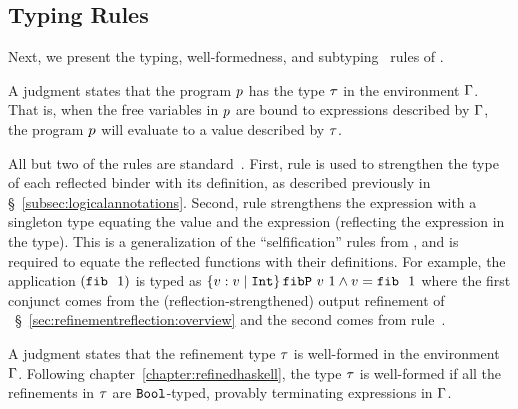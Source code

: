 \subsection{Typing Rules}

%
Next, we present the
typing, well-formedness, and subtyping~\citep{Knowles10,Vazou14}
rules of \corelan.

A judgment \hastype{\env}{\prog}{\typ} states that
the program $p$ has the type $\tau$ in
the environment $\Gamma$.
That is, when the free variables in $p$ are
bound to expressions described by $\Gamma$, the
program $p$ will evaluate to a value
described by $\tau$.

%
All but two of the rules are standard~\cite{Knowles10,Vazou14}.
%
First, rule \rtreflect is used to strengthen the type of each
reflected binder with its definition, as described previously
in \S~\ref{subsec:logicalannotations}.
%
Second, rule \rtexact strengthens the expression with
a singleton type equating the value and the expression
(\ie reflecting the expression in the type).
%
This is a generalization of the ``selfification'' rules
from \cite{Ou2004,Knowles10}, and is required to
equate the reflected functions with their definitions.
%
For example, the application $(\texttt{fib}\ {\ }1)$ is typed as
${\tref{v}{\tint}{\fibdef\ v\ 1 \wedge v = \fib\ 1}}$ where
the first conjunct comes from the (reflection-strengthened)
output refinement of \fib~\S~\ref{sec:refinementreflection:overview} and
the second comes from rule~\rtexact.
%


A judgment \iswellformed{\env}{\typ} states that
the refinement type $\tau$ is well-formed in
the environment $\Gamma$.
%
Following chapter~\ref{chapter:refinedhaskell}, the type $\tau$ is well-formed if all
the refinements in $\tau$ are $\texttt{Bool}$-typed,
provably terminating expressions in $\Gamma$.
%

